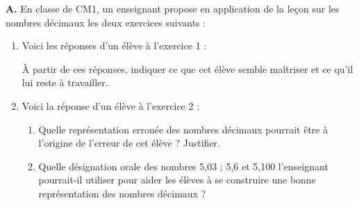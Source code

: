 \begin{exercice}[CRPE 2014 G1]
{\bf A.} En classe de CM1, un enseignant propose en application de la leçon sur les nombres décimaux les deux exercices suivants :
\begin{center}
\end{center}
\begin{center}
\end{center}
\begin{enumerate}
   \item Voici les réponses d'un élève à l'exercice 1 :
   \begin{center}
   \end{center}
   À partir de ces réponses, indiquer ce que cet élève semble maîtriser et ce qu'il lui reste à travailler.
   \item Voici la réponse d'un élève à l'exercice 2 :
   \begin{center}
   \end{center}
   \begin{enumerate}
      \item Quelle représentation erronée des nombres décimaux pourrait être à l'origine de l'erreur de cet élève ? Justifier.
      \item Quelle désignation orale des nombres 5,03 ; 5,6 et 5,100 l'enseignant pourrait-il utiliser pour aider les élèves à se construire une bonne représentation des nombres décimaux ?
   \end{enumerate}
\end{enumerate}


\end{exercice}
